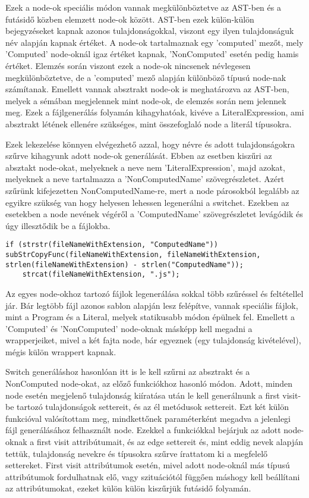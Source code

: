 Ezek a node-ok speciális módon vannak megkülönböztetve az AST-ben és a futásidő közben elemzett node-ok között. AST-ben ezek külön-külön bejegyzéseket kapnak azonos tulajdonságokkal, viszont egy ilyen tulajdonságuk név alapján kapnak értéket. A node-ok tartalmaznak egy 'computed' mezőt, mely 'Computed' node-oknál igaz értéket kapnak, 'NonComputed' esetén pedig hamis értéket. Elemzés során viszont ezek a node-ok nincsenek névlegesen megkülönböztetve, de a 'computed' mező alapján különböző típusú node-nak számítanak.
Emellett vannak absztrakt node-ok is meghatározva az AST-ben, melyek a sémában megjelennek mint node-ok, de elemzés során nem jelennek meg. Ezek a fájlgenerálás folyamán kihagyhatóak, kivéve a LiteralExpression, ami absztrakt létének ellenére szükséges, mint összefoglaló node a literál típusokra.

Ezek lekezelése könnyen elvégezhető azzal, hogy névre és adott tulajdonságokra szűrve kihagyunk adott node-ok generálását. 
Ebben az esetben kiszűri az absztakt node-okat, melyeknek a neve nem 'LiteralExpression', majd azokat, melyeknek a neve tartalmazza a 'NonComputedName' szövegrészletet. Azért szűrünk kifejezetten NonComputedName-re, mert a node párosokból legalább az egyikre szükség van hogy helyesen lehessen legenerálni a switchet. Ezekben az esetekben a node nevének végéről a 'ComputedName' szövegrészletet levágódik és úgy illesztődik be a fájlokba.

\begin{lstlisting}[caption={Computed és NonComputed node-ok kezelése},label={lst:abs-compnoncomp}, style={CStyle}]
if (strstr(fileNameWithExtension, "ComputedName")) subStrCopyFunc(fileNameWithExtension, fileNameWithExtension, strlen(fileNameWithExtension) - strlen("ComputedName"));
	strcat(fileNameWithExtension, ".js");
\end{lstlisting}


Az egyes node-okhoz tartozó fájlok legenerálása sokkal több szűréssel és feltétellel jár. Bár legtöbb fájl azonos sablon alapján lesz felépítve, vannak speciális fájlok, mint a Program és a Literal, melyek statikusabb módon épülnek fel. Emellett a 'Computed' és 'NonComputed' node-oknak másképp kell megadni a wrapperjeiket, mivel a két fajta node, bár egyeznek (egy tulajdonság kivételével), mégis külön wrappert kapnak.

Switch generáláshoz hasonlóan itt is le kell szűrni az absztrakt és a NonComputed node-okat, az előző funkciókhoz hasonló módon.
Adott, minden node esetén megjelenő tulajdonság kiíratása után le kell generálnunk a first visit-be tartozó tulajdonságok settereit, és az él metódusok settereit. Ezt két külön funkcióval valósítottam meg, mindkettőnek paraméterként megadva a jelenlegi fájl generálásához felhasznált node. 
Ezekkel a funkciókkal bejárjuk az adott node-oknak a first visit attribútumait, és az edge settereit és, mint eddig nevek alapján tettük, tulajdonság nevekre és típusokra szűrve írattatom ki a megfelelő settereket.
First visit attribútumok esetén, mivel adott node-oknál más típusú attribútumok fordulhatnak elő, vagy szituációtól függően máshogy kell beállítani az attribútumokat, ezeket külön külön kiszűrjük futásidő folyamán.

